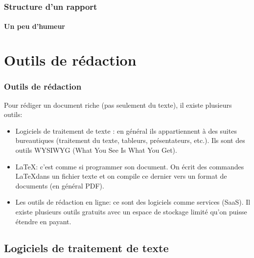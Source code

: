 \documentclass[xcolor=table]{beamer}
\begin{document}
\begin{frame}
\frametitle{Structure d'un rapport}
\framesubtitle{Un peu d'humeur}


\end{frame}


\section{Outils de rédaction}

\begin{frame}
\frametitle{Outils de rédaction}

Pour rédiger un document riche (pas seulement du texte), il existe plusieurs outils:
%
\begin{itemize}
	\item Logiciels de traitement de texte : en général ils appartiennent à des suites bureautiques (traitement du texte, tableurs, présentateurs, etc.). Ils sont des outils WYSIWYG (What You See Is What You Get).
	\item \LaTeX : c'est comme si programmer son document. On écrit des commandes \LaTeX dans un fichier texte et on compile ce dernier vers un format de documents (en général PDF). 
	\item Les outils de rédaction en ligne: ce sont des logiciels comme services (SaaS). Il existe plusieurs outils gratuits avec un espace de stockage limité qu'on puisse étendre en payant.
\end{itemize}
\end{frame}

\subsection{Logiciels de traitement de texte}
\end{document}
